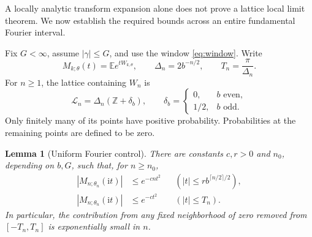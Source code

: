 \documentclass[11pt]{article}
\newtheorem{lemma}[theorem]{Lemma}
\theoremstyle{definition}
\newcommand{\E}{\mathbb E}
\newcommand{\ii}{\mathrm i}
\begin{document}
A locally analytic transform expansion alone does not prove a lattice
local limit theorem. We now establish the required bounds across an
entire fundamental Fourier interval.

Fix $G<\infty$, assume $|\gamma|\leq G$, and use the window
\eqref{eq:window}. Write
\[
 M_{k;\theta}(t)=\E e^{tW_{k,\theta}},\qquad
 \Delta_n=2b^{-n/2},\qquad T_n=\frac{\pi}{\Delta_n}.
\]
For $n\geq1$, the lattice containing $W_n$ is
\begin{equation}\label{eq:lattice}
 \mathcal L_n=\Delta_n(\mathbb Z+\delta_b),\qquad
 \delta_b=\begin{cases}0,&b\text{ even},\\[1pt]1/2,&b\text{ odd}.
 \end{cases}
\end{equation}
Only finitely many of its points have positive probability. Probabilities
at the remaining points are defined to be zero.

\begin{lemma}[Uniform Fourier control]\label{lem:fourier}
There are constants $c,r>0$ and $n_0$, depending on $b,G$, such that,
for $n\geq n_0$,
\begin{align}
 |M_{n;\theta_n}(\ii t)|&\leq e^{-cn t^2}
       &&\left(|t|\leq r b^{\lceil n/2\rceil/2}\right),
       \label{eq:fourier-mid}\\
 |M_{n;\theta_n}(\ii t)|&\leq e^{-ct^2}
       &&\left(|t|\leq T_n\right).
       \label{eq:fourier-full}
\end{align}
In particular, the contribution from any fixed neighborhood of zero
removed from $[-T_n,T_n]$ is exponentially small in $n$.
\end{lemma}
\end{document}
